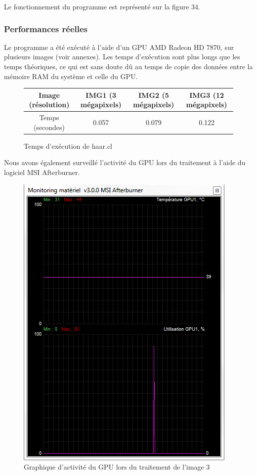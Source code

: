 Le fonctionnement du programme est représenté sur la figure 34.

\subsubsection{Performances réelles}

Le programme a été exécuté à l'aide d'un GPU AMD Radeon HD 7870, sur plusieurs images (voir annexes). Les temps d'exécution sont plus longs que les temps théoriques, ce qui est sans doute dû au temps de copie des données entre la mémoire RAM du système et celle du GPU.

\begin{figure}[!h]
\begin{center}
\begin{tabular}{|c|c|c|c|}
\hline
Image (résolution) & IMG1 (3 mégapixels)   & IMG2 (5 mégapixels)   &   IMG3 (12 mégapixels)   \\ 
\hline
Temps (secondes) & 0.057  & 0.079   &   0.122 \\
\hline
\end{tabular}
\end{center}
\caption{Temps d'exécution de haar.cl}
\label{tab7}
\end{figure}

Nous avons également surveillé l'activité du GPU lors du traitement à l'aide du logiciel MSI Afterburner. 

\begin{figure}[!h]
\centering
\includegraphics[scale=0.7]{images/monitor.png}
\caption{Graphique d'activité du GPU lors du traitement de l'image 3}
\label{afterburn}
\end{figure}

\clearpage
